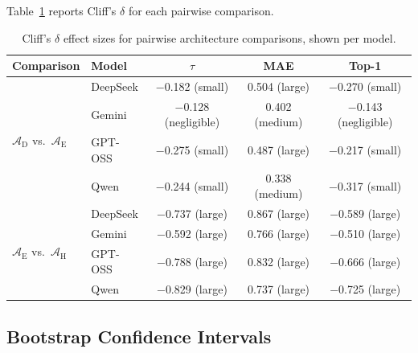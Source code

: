 \documentclass[final,3p,times]{elsarticle}
\begin{document}
Table~\ref{tab:effect_sizes} reports Cliff's $\delta$ for each pairwise comparison.

\begin{table}[t]
\begin{threeparttable}
\small
\centering
\renewcommand{\arraystretch}{1.10}
\caption{Cliff's $\delta$ effect sizes for pairwise architecture comparisons, shown per model.}
\label{tab:effect_sizes}
\begin{tabular}{@{}l l ccc@{}}
\toprule
Comparison & Model & $\tau$ & MAE & Top-1 \\
\midrule
\multirow{4}{*}{$\mathcal{A}_{\text{D}}$ vs.\ $\mathcal{A}_{\text{E}}$}
 & DeepSeek & $-$0.182 (small) & 0.504 (large) & $-$0.270 (small) \\
 & Gemini & $-$0.128 (negligible) & 0.402 (medium) & $-$0.143 (negligible) \\
 & GPT-OSS & $-$0.275 (small) & 0.487 (large) & $-$0.217 (small) \\
 & Qwen & $-$0.244 (small) & 0.338 (medium) & $-$0.317 (small) \\
\midrule
\multirow{4}{*}{$\mathcal{A}_{\text{E}}$ vs.\ $\mathcal{A}_{\text{H}}$}
 & DeepSeek & $-$0.737 (large) & 0.867 (large) & $-$0.589 (large) \\
 & Gemini & $-$0.592 (large) & 0.766 (large) & $-$0.510 (large) \\
 & GPT-OSS & $-$0.788 (large) & 0.832 (large) & $-$0.666 (large) \\
 & Qwen & $-$0.829 (large) & 0.737 (large) & $-$0.725 (large) \\
\bottomrule
\end{tabular}
\renewcommand{\arraystretch}{1.0}
\end{threeparttable}
\end{table}

\subsection{Bootstrap Confidence Intervals}
\end{document}
